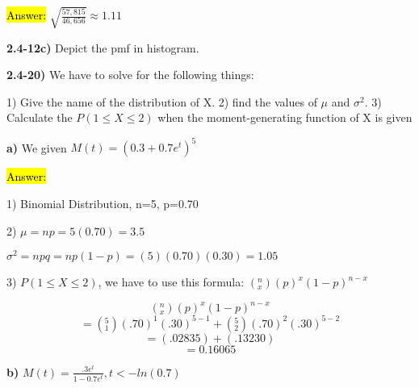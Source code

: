 \documentclass{article}
\begin{document}
\hl{Answer:} $\sqrt{\frac{57,815}{46,656}} \approx 1.11$


\vspace{3mm}

\textbf{2.4-12c)} Depict the pmf in histogram.

\vspace{4mm}









\newpage
\textbf{2.4-20)} We have to solve for the following things:

\vspace{2mm}

1) Give the name of the distribution of X. 
\vspace{2mm}
2) find the values of $\mu$ and $\sigma^{2}$. 
\vspace{2mm}
3) Calculate the $P(1 \le X \le 2)$ when the moment-generating function of X is given
\vspace{5mm}

\textbf{a)} We given $M(t)=(0.3+0.7e^t)^5$

\vspace{2mm}

\hl{Answer:}

\vspace{2mm}
1) Binomial Distribution, n=5, p=0.70

\vspace{2mm}

2) $\mu=np=5(0.70)=3.5$

\vspace{2mm}

$\sigma^{2}=npq=np(1-p)=(5)(0.70)(0.30)=1.05$

\vspace{2mm}

3) $P(1 \le X \le 2)$, we have to use this formula: $(^{n}_{x})(p)^{x}(1-p)^{n-x}$

$$(^{n}_{x})(p)^{x}(1-p)^{n-x}$$
$$=(^5_1)(.70)^{1}(.30)^{5-1}+(^5_2)(.70)^{2}(.30)^{5-2}$$
$$=(.02835)+(.13230)$$
$$=0.16065$$

\vspace{5mm}
\textbf{b)} $M(t)=\frac{.3e^{t}}{1-0.7e^{t}}, t< -ln(0.7)$ 

\vspace{2mm}
\end{document}
